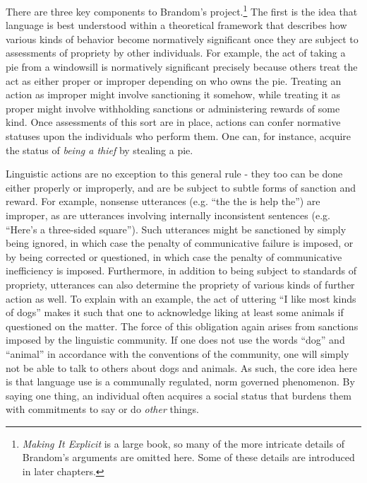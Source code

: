There are three key components to Brandom's project.\footnote{\textit{Making It Explicit} is a large book, so many of the more intricate details of Brandom's arguments are omitted here. Some of these details are introduced in later chapters.} The first is the idea that language is best understood within a theoretical framework that describes how various kinds of behavior become normatively significant once they are subject to assessments of propriety by other individuals. For example, the act of taking a pie from a windowsill is normatively significant precisely because others treat the act as either proper or improper depending on who owns the pie. Treating an action as improper might involve sanctioning it somehow, while treating it as proper might involve withholding sanctions or administering rewards of some kind. Once assessments of this sort are in place, actions can confer normative statuses upon the individuals who perform them. One can, for instance, acquire the status of \textit{being a thief} by stealing a pie. 

Linguistic actions are no exception to this general rule - they too can be done either properly or improperly, and are be subject to subtle forms of sanction and reward. For example, nonsense utterances (e.g. ``the the is help the'') are improper, as are utterances involving internally inconsistent sentences (e.g. ``Here's a three-sided square''). Such utterances might be sanctioned by simply being ignored, in which case the penalty of communicative failure is imposed, or by being corrected or questioned, in which case the penalty of communicative inefficiency is imposed. Furthermore, in addition to being subject to standards of propriety, utterances can also determine the propriety of various kinds of further action as well. To explain with an example, the act of uttering ``I like most kinds of dogs'' makes it such that one  to acknowledge liking at least some animals if questioned on the matter. The force of this obligation again arises from sanctions imposed by the linguistic community. If one does not use the words ``dog'' and ``animal'' in accordance with the conventions of the community, one will simply not be able to talk to others about dogs and animals. As such, the core idea here is that language use is a communally regulated, norm governed phenomenon. By saying one thing, an individual often acquires a social status that burdens them with commitments to say or do \textit{other} things.

